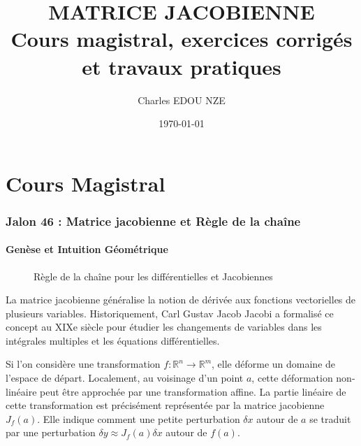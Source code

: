 \documentclass[11pt,a4paper]{article}
\title{\Huge MATRICE JACOBIENNE \\ \large Cours magistral, exercices corrigés et travaux pratiques}
\author{\Large Charles EDOU NZE}
\date{\today}
\begin{document}
\maketitle
\tableofcontents
\newpage

\part{Cours Magistral}


\section{Jalon 46 : Matrice jacobienne et Règle de la chaîne}

\subsection{Genèse et Intuition Géométrique}

\begin{figure}[h]
\centering
{}
\caption{Règle de la chaîne pour les différentielles et Jacobiennes}
\end{figure}


La matrice jacobienne généralise la notion de dérivée aux fonctions vectorielles de plusieurs variables. Historiquement, Carl Gustav Jacob Jacobi a formalisé ce concept au XIXe siècle pour étudier les changements de variables dans les intégrales multiples et les équations différentielles.

Si l'on considère une transformation $f : \mathbb{R}^n \to \mathbb{R}^m$, elle déforme un domaine de l'espace de départ. Localement, au voisinage d'un point $a$, cette déformation non-linéaire peut être approchée par une transformation affine. La partie linéaire de cette transformation est précisément représentée par la matrice jacobienne $J_f(a)$. Elle indique comment une petite perturbation $\delta x$ autour de $a$ se traduit par une perturbation $\delta y \approx J_f(a) \delta x$ autour de $f(a)$.
\end{document}
